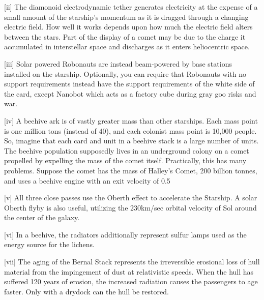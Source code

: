 \documentclass[a4paper]{book}
\begin{document}
[ii] The diamonoid electrodynamic tether generates electricity at the expense of a small amount of the starship’s momentum as it is dragged through a changing electric field. How well it works depends upon how much the electric field alters between the stars. Part of the display of a comet may be due to the charge it accumulated in interstellar space and discharges as it enters heliocentric space.

[iii] Solar powered Robonauts are instead beam-powered by base stations installed on the starship. Optionally, you can require that Robonauts with no support requirements instead have the support requirements of the white side of the card, except Nanobot which acts as a factory cube during gray goo risks and war.
 
[iv] A beehive ark is of vastly greater mass than other starships. Each mass point is one million tons (instead of 40), and each colonist mass point is 10,000 people. So, imagine that each card and unit in a beehive stack is a large number of units. The beehive population supposedly lives in an underground colony on a comet propelled by expelling the mass of the comet itself. Practically, this has many problems. Suppose the comet has the mass of Halley’s Comet, 200 billion tonnes, and uses a beehive engine with an exit velocity of 0.5%
 
[v] All three close passes use the Oberth effect to accelerate the Starship. A solar Oberth flyby is also useful, utilizing the 230km/sec orbital velocity of Sol around the center of the galaxy. 

[vi] In a beehive, the radiators additionally represent sulfur lamps used as the energy source for the lichens.
 
[vii] The aging of the Bernal Stack represents the irreversible erosional loss of hull material from the impingement of dust at relativistic speeds. When the hull has suffered 120 years of erosion, the increased radiation causes the passengers to age faster. Only with a drydock can the hull be restored.
 
\end{document}
